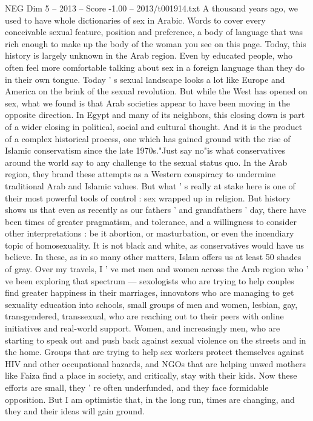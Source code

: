 \begin{textsample}{NEG Dim 5 – 2013 – Score -1.00 – 2013/t001914.txt}
A thousand years ago, we used to have whole dictionaries of sex in Arabic.
Words to cover every conceivable sexual feature, position and preference, a body of language that was rich enough to make up the body of the woman you see on this page.
Today, this history is largely unknown in the Arab region.
Even by educated people, who often feel more comfortable talking about sex in a foreign language than they do in their own tongue.
Today ' s sexual landscape looks a lot like Europe and America on the brink of the sexual revolution.
But while the West has opened on sex, what we found is that Arab societies appear to have been moving in the opposite direction.
In Egypt and many of its neighbors, this closing down is part of a wider closing in political, social and cultural thought.
And it is the product of a complex historical process, one which has gained ground with the rise of Islamic conservatism since the late 1970s."Just say no"is what conservatives around the world say to any challenge to the sexual status quo.
In the Arab region, they brand these attempts as a Western conspiracy to undermine traditional Arab and Islamic values.
But what ' s really at stake here is one of their most powerful tools of control : sex wrapped up in religion.
But history shows us that even as recently as our fathers ' and grandfathers ' day, there have been times of greater pragmatism, and tolerance, and a willingness to consider other interpretations : be it abortion, or masturbation, or even the incendiary topic of homosexuality.
It is not black and white, as conservatives would have us believe.
In these, as in so many other matters, Islam offers us at least 50 shades of gray.
Over my travels, I ' ve met men and women across the Arab region who ' ve been exploring that spectrum — sexologists who are trying to help couples find greater happiness in their marriages, innovators who are managing to get sexuality education into schools, small groups of men and women, lesbian, gay, transgendered, transsexual, who are reaching out to their peers with online initiatives and real-world support.
Women, and increasingly men, who are starting to speak out and push back against sexual violence on the streets and in the home.
Groups that are trying to help sex workers protect themselves against HIV and other occupational hazards, and NGOs that are helping unwed mothers like Faiza find a place in society, and critically, stay with their kids.
Now these efforts are small, they ' re often underfunded, and they face formidable opposition.
But I am optimistic that, in the long run, times are changing, and they and their ideas will gain ground.

\end{textsample}
